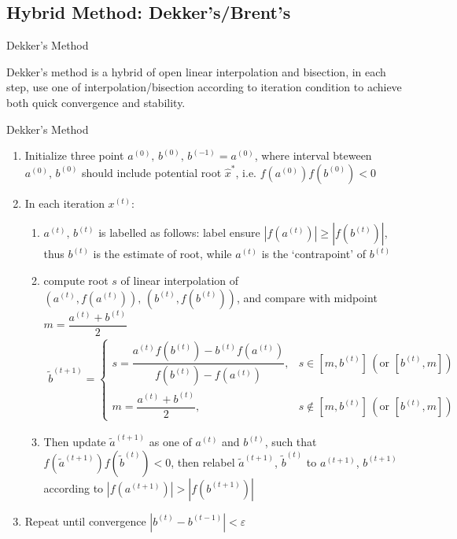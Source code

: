     


\subsection{Hybrid Method: Dekker's/Brent's}
\hypertarget{HybridMethod}{}

\begin{point}
    \hypertarget{Dekker}{Dekker's Method}
\end{point}

    Dekker's method is a hybrid of open linear interpolation and bisection, in each step, use one of interpolation/bisection according to iteration condition to achieve both quick convergence and stability.
\begin{algorithm}{Dekker's Method}

\begin{enumerate}[topsep=2pt,itemsep=2pt]
    \item Initialize three point $ a^{(0)},\,b^{(0)},\, b^{(-1)}=a^{(0)} $, where interval bteween $a^{(0)},\,b^{(0)} $ should include potential root $ \hat{x}^{*} $, i.e. $ f(a^{(0)})f(b^{(0)})<0 $
    \item In each iteration $ x^{(t)} $:
    \begin{enumerate}[topsep=2pt,itemsep=2pt]
        \item $ a^{(t)},\,b^{(t)} $ is labelled as follows: label ensure $ |f(a^{(t)})|\geq |f(b^{(t)})| $, thus $ b^{(t)} $ is the estimate of root, while $ a^{(t)} $ is the `contrapoint' of $ b^{(t)} $
        \item compute root $ s $ of linear interpolation of $ (a^{(t)},f(a^{(t)})), \, (b^{(t)},f(b^{(t)})) $, and compare with midpoint $ m=\dfrac{a^{(t)}+b^{(t)}}{2} $
        \begin{align}
            \tilde{b}^{(t+1)}= 
            \begin{cases}
                s=\dfrac{a^{(t)}f(b^{(t)})-b^{(t)}f(a^{(t)})}{f(b^{(t)})-f(a^{(t)})},&s\in [m,b^{(t)}]\,(\text{or }[b^{(t)},m])\\
                m=\dfrac{a^{(t)}+b^{(t)}}{2},&s\notin [m,b^{(t)}]\,(\text{or }[b^{(t)},m])
            \end{cases}
        \end{align}
        \item Then update $ \tilde{a}^{(t+1)} $ as one of $ a^{(t)} $ and $ b^{(t)} $, such that $ f(\tilde{a}^{(t+1)})f(\tilde{b}^{(t)})<0 $, then relabel $ \tilde{a}^{(t+1)} $, $ \tilde{b}^{(t)} $ to $ a^{(t+1)} $, $ b^{(t+1)} $ according to $ |f(a^{(t+1)})|>|f(b^{(t+1)})| $
    \end{enumerate}
    \item Repeat until convergence $ |b^{(t)}-b^{(t-1)}|<\varepsilon  $
\end{enumerate}

    
\end{algorithm}
    

